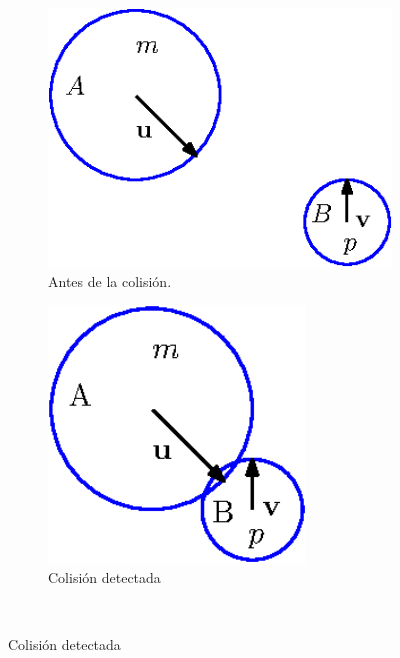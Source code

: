 \begin{figure}
 \centering
  \begin{subfigure}[b]{0.32\textwidth}
    \includegraphics[width=1.2\textwidth]{Img/02/colisionesAntes}
    \caption{Antes de la colisión.}
    \label{fig:coliAntes}
  \end{subfigure}
  \hspace{2cm}
  \begin{subfigure}[b]{0.32\textwidth}
    \includegraphics[width=0.75\textwidth]{Img/02/colisionesDetecta}
    \caption{Colisión detectada}
    \label{fig:coliDetecta}
  \end{subfigure}
\\
\vspace{1cm}

\end{figure}
